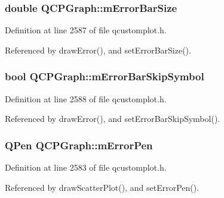 \subsubsection[{m\+Error\+Bar\+Size}]{\setlength{\rightskip}{0pt plus 5cm}double Q\+C\+P\+Graph\+::m\+Error\+Bar\+Size\hspace{0.3cm}{\ttfamily [protected]}}\label{class_q_c_p_graph_a7b51c8d09510f9d195b5e765ccbcf05b}


Definition at line 2587 of file qcustomplot.\+h.



Referenced by draw\+Error(), and set\+Error\+Bar\+Size().

\hypertarget{class_q_c_p_graph_acf631d7dbd1055a69ab3b63094868557}{}
\subsubsection[{m\+Error\+Bar\+Skip\+Symbol}]{\setlength{\rightskip}{0pt plus 5cm}bool Q\+C\+P\+Graph\+::m\+Error\+Bar\+Skip\+Symbol\hspace{0.3cm}{\ttfamily [protected]}}\label{class_q_c_p_graph_acf631d7dbd1055a69ab3b63094868557}


Definition at line 2588 of file qcustomplot.\+h.



Referenced by draw\+Error(), and set\+Error\+Bar\+Skip\+Symbol().

\hypertarget{class_q_c_p_graph_aa35681a24165c2831301091a87b662ce}{}
\subsubsection[{m\+Error\+Pen}]{\setlength{\rightskip}{0pt plus 5cm}Q\+Pen Q\+C\+P\+Graph\+::m\+Error\+Pen\hspace{0.3cm}{\ttfamily [protected]}}\label{class_q_c_p_graph_aa35681a24165c2831301091a87b662ce}


Definition at line 2583 of file qcustomplot.\+h.



Referenced by draw\+Scatter\+Plot(), and set\+Error\+Pen().

\hypertarget{class_q_c_p_graph_a29e64273db201aeadebc61c870720a36}{}

